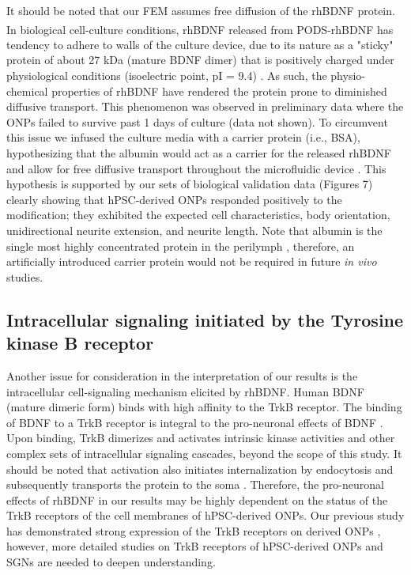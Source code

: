 \documentclass[review]{elsarticle}
\begin{document}
\indent It should be noted that our FEM assumes free diffusion of the rhBDNF protein. In biological cell-culture conditions, rhBDNF released from PODS\textsuperscript{\textregistered}-rhBDNF has tendency to adhere to walls of the culture device, due to its nature as a "sticky" protein of about 27 kDa (mature BDNF dimer) that is positively charged under physiological conditions (isoelectric point, pI = 9.4) \cite{Sasi2017}. As such, the physio-chemical properties of rhBDNF have rendered the protein prone to diminished diffusive transport. This phenomenon was observed in preliminary data where the ONPs failed to survive past 1 days of culture (data not shown). To circumvent this issue we infused the culture media with a carrier protein (i.e., BSA), hypothesizing that the albumin would act as a carrier for the released rhBDNF and allow for free diffusive transport throughout the microfluidic device \cite{Li2010}. This hypothesis is supported by our sets of biological validation data (Figures 7) clearly showing that hPSC-derived ONPs responded positively to the modification; they exhibited the expected cell characteristics, body orientation, unidirectional neurite extension, and neurite length. Note that albumin is the single most highly concentrated protein in the perilymph \cite{Swan2009}, therefore, an artificially introduced carrier protein would not be required in future \textit{in vivo} studies.  

\subsection{Intracellular signaling initiated by the Tyrosine kinase B receptor}
Another issue for consideration in the interpretation of our results is the intracellular cell-signaling mechanism elicited by rhBDNF. Human BDNF (mature dimeric form) binds with high affinity to the TrkB receptor. The binding of BDNF to a TrkB receptor is integral to the pro-neuronal effects of BDNF \cite{green2012}. Upon binding, TrkB dimerizes and activates intrinsic kinase activities and other complex sets of intracellular signaling cascades, beyond the scope of this study. It should be noted that activation also initiates internalization by endocytosis and subsequently transports the protein to the soma \cite{Numakawa2010}. Therefore, the pro-neuronal effects of rhBDNF in our results may be highly dependent on the status of the TrkB receptors of the cell membranes of hPSC-derived ONPs. Our previous study has demonstrated strong expression of the TrkB receptors on derived ONPs \cite{Matsuoka2017}, however, more detailed studies on TrkB receptors of hPSC-derived ONPs and SGNs are needed to deepen understanding.
\end{document}
